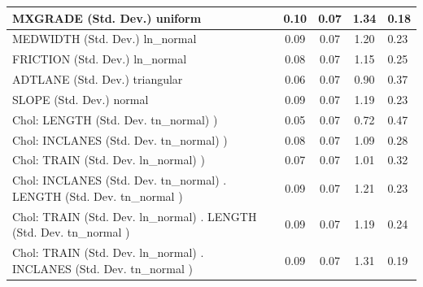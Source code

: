 \begin{table}
\begin{center}
\begin{tabular}{|l|l|c|c|c|l|}
			\hline
			MXGRADE (Std. Dev.) uniform &  & 0.10 & 0.07 & 1.34 & 0.18 \\
			\hline
			MEDWIDTH (Std. Dev.) ln_normal &  & 0.09 & 0.07 & 1.20 & 0.23 \\
			\hline
			FRICTION (Std. Dev.) ln_normal &  & 0.08 & 0.07 & 1.15 & 0.25 \\
			\hline
			ADTLANE (Std. Dev.) triangular &  & 0.06 & 0.07 & 0.90 & 0.37 \\
			\hline
			SLOPE (Std. Dev.) normal &  & 0.09 & 0.07 & 1.19 & 0.23 \\
			\hline
			 Chol: LENGTH (Std. Dev. tn_normal) ) &  & 0.05 & 0.07 & 0.72 & 0.47 \\
			\hline
			 Chol: INCLANES (Std. Dev. tn_normal) ) &  & 0.08 & 0.07 & 1.09 & 0.28 \\
			\hline
			 Chol: TRAIN (Std. Dev. ln_normal) ) &  & 0.07 & 0.07 & 1.01 & 0.32 \\
			\hline
			 Chol: INCLANES (Std. Dev. tn_normal) . LENGTH (Std. Dev.   tn_normal ) &  & 0.09 & 0.07 & 1.21 & 0.23 \\
			\hline
			 Chol: TRAIN (Std. Dev. ln_normal) . LENGTH (Std. Dev.   tn_normal ) &  & 0.09 & 0.07 & 1.19 & 0.24 \\
			\hline
			 Chol: TRAIN (Std. Dev. ln_normal) . INCLANES (Std. Dev.   tn_normal ) &  & 0.09 & 0.07 & 1.31 & 0.19 \\
			\hline
		\end{tabular}
	\end{center}
\end{table}